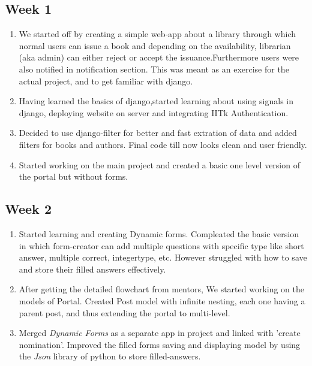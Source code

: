 \documentclass[12pt,a4paper]{scrartcl}
\begin{document}
\subsection{Week 1}
\begin{enumerate}
	\item We started off by creating a simple web-app about a library through which normal users can issue a book and depending on the availability, librarian (aka admin) can either reject or accept the issuance.Furthermore users were also notified in notification section. This was meant as an exercise for the actual project, and to get familiar with django.
	\item Having learned the basics of django,started learning about using signals in django, deploying website on server and integrating IITk Authentication.
	\item Decided to use django-filter for better and fast extration of data and added filters for books and authors. Final code till now looks clean and user friendly.
	\item Started working on the main project and created a basic one level version of the portal but without forms.
\end{enumerate}

\subsection{Week 2}
\begin{enumerate}
	\item Started learning and creating Dynamic forms. Compleated the basic version in which form-creator can add multiple questions with specific type like short answer, multiple correct, integertype, etc. However struggled with how to save and store their filled answers effectively. 
	\item After getting the detailed flowchart from mentors, We started working on the models of Portal. Created Post model with infinite nesting, each one having a parent post, and thus extending the portal to multi-level.
	\item Merged \textit{{Dyn}amic Forms} as a separate app in project and linked with 'create nomination'. Improved the filled forms saving and displaying model by  using the \textit{Json} library of python to store filled-answers.
\end{enumerate}
\end{document}
